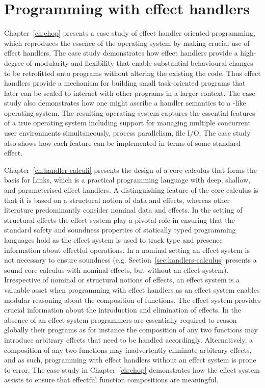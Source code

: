 \documentclass[12pt,phd,lfcs,twoside,openright,logo,leftchapter,normalheadings]{infthesis}
\theoremstyle{plain}
\theoremstyle{definition}
\begin{document}
\section{Programming with effect handlers}
Chapter~\ref{ch:ehop} presents a case study of effect handler oriented
programming, which reproduces the essence of the \UNIX{} operating
system by making crucial use of effect handlers. The case study
demonstrates how effect handlers provide a high-degree of modularity
and flexibility that enable substantial behavioural changes to be
retrofitted onto programs without altering the existing the code. Thus
effect handlers provide a mechanism for building small task-oriented
programs that later can be scaled to interact with other programs in a
larger context.
%
The case study also demonstrates how one might ascribe a handler
semantics to a \UNIX{}-like operating system. The resulting operating
system \OSname{} captures the essential features of a true operating
system including support for managing multiple concurrent user
environments simultaneously, process parallelism, file I/O. The case
study also shows how each feature can be implemented in terms of some
standard effect.

Chapter~\ref{ch:handler-calculi} presents the design of a core
calculus that forms the basis for Links, which is a practical
programming language with deep, shallow, and parameterised effect
handlers. A distinguishing feature of the core calculus is that it is
based on a structural notion of data and effects, whereas other
literature predominantly consider nominal data and effects. In the
setting of structural effects the effect system play a pivotal role in
ensuring that the standard safety and soundness properties of
statically typed programming languages hold as the effect system is
used to track type and presence information about effectful
operations. In a nominal setting an effect system is not necessary to
ensure soundness (e.g. Section~\ref{sec:handlers-calculus} presents a
sound core calculus with nominal effects, but without an effect
system). Irrespective of nominal or structural notions of effects, an
effect system is a valuable asset when programming with effect
handlers as an effect system enables modular reasoning about the
composition of functions. The effect system provides crucial
information about the introduction and elimination of effects. In the
absence of an effect system programmers are essentially required to
reason globally their programs as for instance the composition of any
two functions may introduce arbitrary effects that need to be handled
accordingly. Alternatively, a composition of any two functions may
inadvertently eliminate arbitrary effects, and as such, programming
with effect handlers without an effect system is prone to error. The
\UNIX{} case study in Chapter~\ref{ch:ehop} demonstrates how the
effect system assists to ensure that effectful function compositions
are meaningful.
\end{document}
